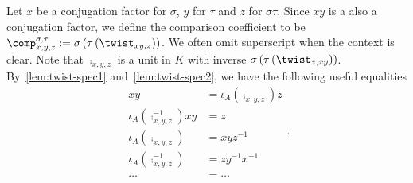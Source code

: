 \begin{construction}\label{con:compare-conj-factors}
  Let $x$ be a conjugation factor for $\sigma$, $y$ for $\tau$ and $z$ for $\sigma\tau$. Since $xy$ is a also a conjugation factor, we define the comparison coefficient to be $\comp^{\sigma, \tau}_{x,y,z}:=\sigma\left(\tau\left(\twist_{xy, z}\right)\right)$. We often omit superscript when the context is clear. Note that $\comp_{x,y,z}$ is a unit in $K$ with inverse $\sigma\left(\tau\left(\twist_{z, xy}\right)\right)$. By~\cref{lem:twist-spec1} and~\cref{lem:twist-spec2}, we have the following useful equalities
  \[
    \begin{aligned}
      xy &= \iota_{A}\left(\comp_{x,y,z}\right)z \\
      \iota_{A}\left(\comp_{x,y,z}^{-1}\right)xy &= z \\
      \iota_{A}\left(\comp_{x,y,z}\right) &= xyz^{-1}\\
      \iota_{A}\left(\comp_{x,y,z}^{-1}\right) &= zy^{-1}x^{-1}\\
      \dots &=\dots
    \end{aligned}.
  \]
  \leanok
\end{construction}


